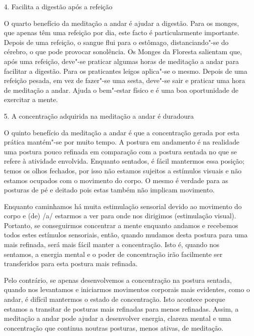 \begin{siderule-quote}
  4. Facilita a digestão após a refeição
\end{siderule-quote}

O quarto benefício da meditação a andar é ajudar a digestão. Para os
monges, que apenas têm uma refeição por dia, este facto é
particularmente importante. Depois de uma refeição, o sangue flui para o
estômago, distanciando"-se do cérebro, o que pode provocar sonolência. Os
Monges da Floresta salientam que, após uma refeição, deve"-se praticar
algumas horas de meditação a andar para facilitar a digestão. Para os
praticantes leigos aplica"-se o mesmo. Depois de uma refeição pesada, em
vez de fazer"-se uma sesta, deve"-se sair e praticar uma hora de meditação
a andar. Ajuda o bem"-estar físico e é uma boa oportunidade de exercitar
a mente.

\begin{siderule-quote}
  5. A concentração adquirida na meditação a andar é duradoura
\end{siderule-quote}

O quinto benefício da meditação a andar é que a concentração gerada por
esta prática mantém"-se por muito tempo. A postura em andamento é na
realidade uma postura pouco refinada em comparação com a postura sentada
no que se refere à atividade envolvida. Enquanto sentados, é fácil
mantermos essa posição; temos os olhos fechados, por isso não estamos
sujeitos a estímulos visuais e não estamos ocupados com o movimento do
corpo. O mesmo é verdade para as posturas de pé e deitado pois estas
também não implicam movimento.

Enquanto caminhamos há muita estimulação sensorial devido ao movimento
do corpo e (de) /a/ estarmos a ver para onde nos dirigimos (estimulação
visual). Portanto, se conseguirmos concentrar a mente enquanto andamos e
recebemos todos estes estímulos sensoriais, então, quando mudamos desta
postura para uma mais refinada, será mais fácil manter a concentração.
Isto é, quando nos sentamos, a energia mental e o poder de concentração
irão facilmente ser transferidos para esta postura mais refinada.

Pelo contrário, se apenas desenvolvemos a concentração na postura
sentada, quando nos levantamos e iniciarmos movimentos corporais mais
evidentes, como o andar, é difícil mantermos o estado de concentração.
Isto acontece porque estamos a transitar de posturas mais refinadas para
menos refinadas. Assim, a meditação a andar pode ajudar a desenvolver
energia, clareza mental e uma concentração que continua noutras
posturas, menos ativas, de meditação.

